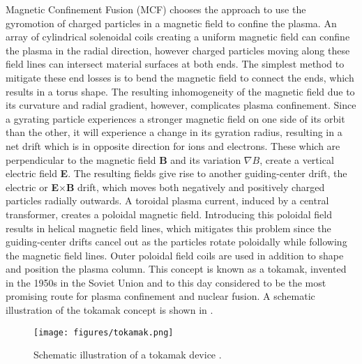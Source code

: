 Magnetic Confinement Fusion (MCF) chooses the approach to use the gyromotion of charged particles in a magnetic field to confine the plasma. An array of cylindrical solenoidal coils creating a uniform magnetic field can confine the plasma in the radial direction, however charged particles moving along these field lines can intersect material surfaces at both ends. The simplest method to mitigate these end losses is to bend the magnetic field to connect the ends, which results in a torus shape. The resulting inhomogeneity of the magnetic field due to its curvature and radial gradient, however, complicates plasma confinement. Since a gyrating particle experiences a stronger magnetic field on one side of its orbit than the other, it will experience a change in its gyration radius, resulting in a net drift which is in opposite direction for ions and electrons. These  which are perpendicular to the magnetic field \textbf{B} and its variation $\nabla B$, create a vertical electric field \textbf{E}. The resulting fields give rise to another guiding-center drift, the electric or \textbf{E}$\times$\textbf{B} drift, which moves both negatively and positively charged particles radially outwards. A toroidal plasma current, induced by a central transformer, creates a poloidal magnetic field. Introducing this poloidal field results in helical magnetic field lines, which mitigates this problem since the guiding-center drifts cancel out as the particles rotate poloidally while following the magnetic field lines. Outer poloidal field coils are used in addition to shape and position the plasma column. This concept is known as a tokamak, invented in the 1950s in the Soviet Union and to this day considered to be the most promising route for plasma confinement and nuclear fusion. A schematic illustration of the tokamak concept is shown in . 
\begin{figure}[t]
	\centering
	\texttt{[image: figures/tokamak.png]}
	\caption{Schematic illustration of a tokamak device \cite{eurofusion}.}
	\label{Fig:tokamak}
\end{figure}

